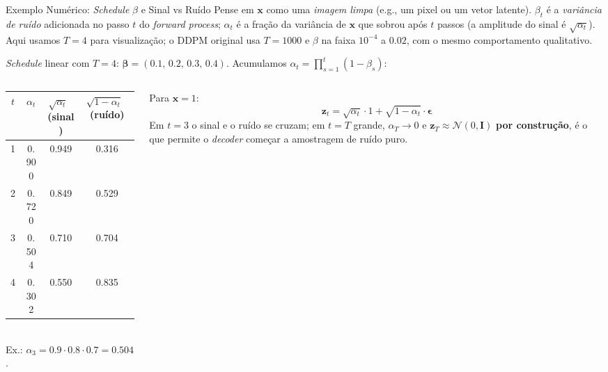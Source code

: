\documentclass[aspectratio=169,xcolor=dvipsnames]{beamer}
\begin{document}
  \begin{frame}{Exemplo Numérico: \textit{Schedule} $\beta$ e Sinal vs Ruído}
    \footnotesize Pense em $\mathbf{x}$ como uma \emph{imagem limpa} (e.g., um
    pixel ou um vetor latente). $\beta_t$ é a \emph{variância de ruído}
    adicionada no passo $t$ do \textit{forward process}; $\alpha_t$ é a
    fração da variância de $\mathbf{x}$ que sobrou após $t$ passos (a
    amplitude do sinal é $\sqrt{\alpha_t}$). Aqui usamos $T = 4$ para
    visualização; o DDPM original usa $T = 1000$ e $\beta$ na faixa
    $10^{-4}$ a $0.02$, com o mesmo comportamento qualitativo.

    \normalsize
    \textit{Schedule} linear com $T = 4$:
    $\boldsymbol{\beta} = (0.1,\, 0.2,\, 0.3,\, 0.4)$.
    Acumulamos $\alpha_t = \prod_{s=1}^{t}(1 - \beta_s)$:
    \vspace{0.2em}
    \begin{columns}[T]
      \begin{column}{0.55\textwidth}
        \centering
        \begin{tabular}{@{}c|c|c|c@{}}
          \toprule
          $t$ & $\alpha_t$  & $\sqrt{\alpha_t}$ \,(sinal)& $\sqrt{1-\alpha_t}$ \,(ruído) \\
          \midrule
          1 & 0.900 & 0.949 & 0.316 \\
          2 & 0.720 & 0.849 & 0.529 \\
          3 & 0.504 & 0.710 & 0.704 \\
          4 & 0.302 & 0.550 & 0.835 \\
          \bottomrule
        \end{tabular}
        \vspace{0.4em}\\
        \scriptsize Ex.: $\alpha_3 = 0.9 \cdot 0.8 \cdot 0.7 = 0.504$.
      \end{column}
      \begin{column}{0.42\textwidth}
        Para $\mathbf{x} = 1$:
        \[
          \mathbf{z}_t = \sqrt{\alpha_t}\cdot 1 + \sqrt{1 - \alpha_t}\cdot \boldsymbol{\epsilon}
        \]
        \vspace{-0.4em}
        Em $t = 3$ o sinal e o ruído se cruzam; em $t = T$ grande,
        $\alpha_T \to 0$ e $\mathbf{z}_T \approx \mathcal{N}(0, \mathbf{I})$
        \textbf{por construção}, é o que permite o \textit{decoder}
        começar a amostragem de ruído puro.
      \end{column}
    \end{columns}
  \end{frame}
\end{document}

